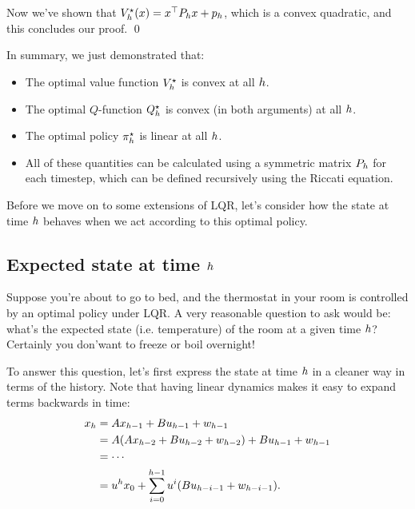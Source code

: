 \documentclass[../main/main]{subfiles}
\begin{document}
Now we've shown that $V^\star_h(x) = x^\top P_h x + p_h$, which is a convex quadratic, and this concludes our proof. \qed

In summary, we just demonstrated that:

\begin{itemize}
    \item The optimal value function $V^\star_h$ is convex at all $h$.
    \item The optimal $Q$-function $Q^\star_h$ is convex (in both arguments) at all $h$.
    \item The optimal policy $\pi^\star_h$ is linear at all $h$.
    \item All of these quantities can be calculated using a symmetric matrix $P_h$ for each timestep, which can be defined recursively using the Riccati equation.
\end{itemize}

Before we move on to some extensions of LQR, let's consider how the state at time $h$ behaves when we act according to this optimal policy.

\subsection{Expected state at time $h$}


Suppose you're about to go to bed, and the thermostat in your room is controlled by an optimal policy under LQR. A very reasonable question to ask would be: what's the expected state (i.e. temperature) of the room at a given time $h$? Certainly you don'\hi want to freeze or boil overnight!

To answer this question, let's first express the state at time $h$ in a cleaner way in terms of the history. Note that having linear dynamics makes it easy to expand terms backwards in time:
\begin{align*}
    x_h &= A x_{h-1} + B u_{h-1} + w_{h-1} \\
    &= A (Ax_{h-2} + B u_{h-2} + w_{h-2}) + B u_{h-1} + w_{h-1} \\
    &= \cdots \\
    &= u^h x_0 + \sum_{i=0}^{h-1} u^i (B u_{h-i-1} + w_{h-i-1}).
\end{align*}
\end{document}
